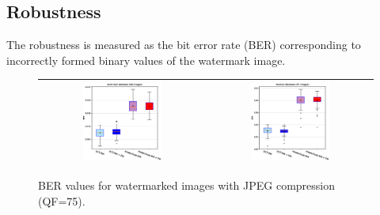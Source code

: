 \documentclass[runningheads]{llncs}
\begin{document}
\subsection{Robustness}
The robustness is measured as the bit error rate (BER) corresponding to incorrectly formed binary values of the watermark image.
\begin{figure}[H]
	\begin{center}
		\begin{tabular}{|c|c|}\hline
			\includegraphics[width=0.5\textwidth]{BER75SaintGall.eps}
			&\includegraphics[width=0.5\textwidth]{BER75Parzival.eps}\\\hline
		\end{tabular}
	\end{center}
	\caption{BER values for watermarked images with JPEG compression (QF=75).}
	\label{ber75}
\end{figure}
\end{document}
